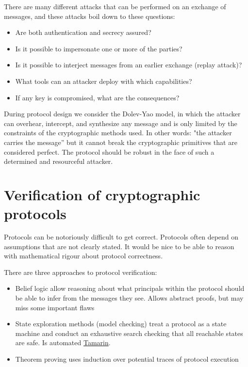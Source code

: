 There are many different attacks that can be performed on an exchange of messages, and these attacks boil down to these questions:
\begin{itemize}
	\item Are both authentication and secrecy assured?
	\item Is it possible to impersonate one or more of the parties?
	\item Is it possible to interject messages from an earlier exchange (replay attack)?
	\item What tools can an attacker deploy with which capabilities?
	\item If any key is compromised, what are the consequences?
\end{itemize}

During protocol design we consider the Dolev-Yao model, in which the attacker can overhear, intercept, and synthesize any message and is only limited by the constraints of the cryptographic methods used. In other words: "the attacker carries the message” but it cannot break the cryptographic primitives that are considered perfect. The protocol should be robust in the face of such a determined and resourceful attacker.

\section{Verification of cryptographic protocols}

Protocols can be notoriously difficult to get correct. Protocols often depend on assumptions that are not clearly stated. It would be nice to be able to reason with mathematical rigour about protocol correctness.

There are three approaches to protocol verification:
\begin{itemize}
	\item Belief logic allow reasoning about what principals within the protocol should be able to infer from the messages they see. Allows abstract proofs, but may miss some important flaws
	\item State exploration methods (model checking) treat a protocol as a state machine and conduct an exhaustive search checking that all reachable states are safe. Is automated \href{https://tamarin-prover.github.io/manual/book/001_introduction.html}{Tamarin}.
	\item Theorem proving uses induction over potential traces of protocol execution
\end{itemize}

